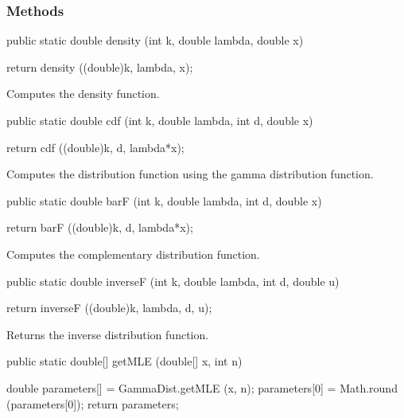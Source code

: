 \subsubsection* {Methods}

\begin{code}

   public static double density (int k, double lambda, double x)\begin{hide} {
      return density ((double)k, lambda, x);
   }\end{hide}
\end{code}
\begin{tabb} Computes the density function.
\end{tabb}
\begin{code}

   public static double cdf (int k, double lambda, int d, double x)\begin{hide} {
      return cdf ((double)k, d, lambda*x);
   }\end{hide}
\end{code}
 \begin{tabb} Computes the distribution function using
   the gamma distribution function.
\end{tabb}
\begin{code}

   public static double barF (int k, double lambda, int d, double x)\begin{hide} {
      return barF ((double)k, d, lambda*x);
   }\end{hide}
\end{code}
\begin{tabb} Computes the complementary distribution function.
\end{tabb}
\begin{code}

   public static double inverseF (int k, double lambda, int d, double u)\begin{hide} {
      return inverseF ((double)k, lambda, d, u);
   }\end{hide}
\end{code}
\begin{tabb}  Returns the inverse distribution function.
\end{tabb}
\begin{code}

   public static double[] getMLE (double[] x, int n)\begin{hide} {
      double parameters[] = GammaDist.getMLE (x, n);
      parameters[0] = Math.round (parameters[0]);
      return parameters;
   }\end{hide}
\end{code}
